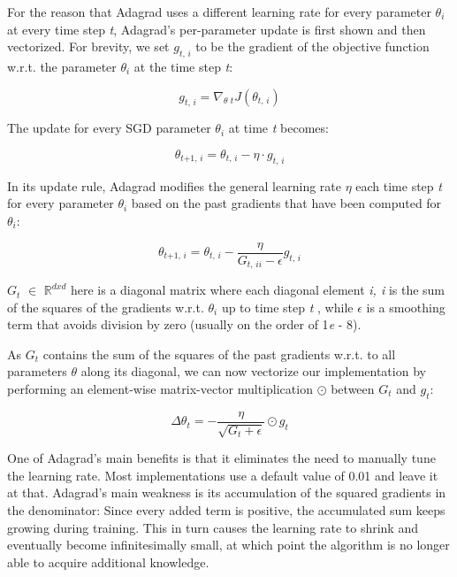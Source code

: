 \documentclass[12pt,oneside,a4paper,parskip]{scrbook}
\newcommand{\R}{\mathbb{R}}
\begin{document}
For the reason that Adagrad uses a different learning rate for every parameter $\theta_i$ at every time step \textit{t},
Adagrad's per-parameter update is first shown and then vectorized. For brevity, we set $\textit{g}_\textit{t, i}$ to be
the gradient of the objective function w.r.t. the parameter $\theta_i$ at the time step \textit{t}:

\begin{equation}
  \textit{g}_\textit{t, i} = \nabla_\textit{$\theta$ t}\textit{J}(\theta_\textit{t, i})
  \label{equ:Adagrad_1}
\end{equation}

The update for every SGD parameter $\theta_i$ at time \textit{t} becomes:

\begin{equation}
  \theta_\textit{t+1, i} = \theta_\textit{t, i} - \eta \cdot \textit{g}_\textit{t, i}
\end{equation}

In its update rule, Adagrad modifies the general learning rate $\eta$ each time step \textit{t} for every parameter
$\theta_i$ based on the past gradients that have been computed for $\theta_i$:

\begin{equation}
  \theta_\textit{t+1, i} = \theta_\textit{t, i}-\frac{\eta}{\textit{G}_\textit{t, ii} - \epsilon} \textit{g}_\textit{t, i}
\end{equation}

$\textit{G}_t$ $\in$ $\R^\textit{dxd}$ here is a diagonal matrix where each diagonal element \textit{i, i} is the sum of the
squares of the gradients w.r.t. $\theta_i$ up to time step \textit{t} \cite{AdadeltaAddition}, while $\epsilon$ is a smoothing term that avoids
division by zero (usually on the order of 1\textit{e} - 8). 

As $\textit{G}_t$ contains the sum of the squares of the past gradients w.r.t. to all parameters $\theta$ along its
diagonal, we can now vectorize our implementation by performing an element-wise matrix-vector multiplication $\odot$
between $\textit{G}_t$ and $\textit{g}_t$:

\begin{equation}
  \Delta\theta_\textit{t} = -\frac{\eta}{\sqrt{\textit{G}_\textit{t} + \epsilon}} \odot \textit{g}_\textit{t}
  \label{equ:Adagrad_2}
\end{equation}

One of Adagrad’s main benefits is that it eliminates the need to manually tune the learning rate. Most implementations 
use a default value of 0.01 and leave it at that.
Adagrad’s main weakness is its accumulation of the squared gradients in the denominator: Since every added term is 
positive, the accumulated sum keeps growing during training. This in turn causes the learning rate to shrink and eventually
become infinitesimally small, at which point the algorithm is no longer able to acquire additional knowledge. \cite{overvieDiffRSLVQ}
\end{document}
